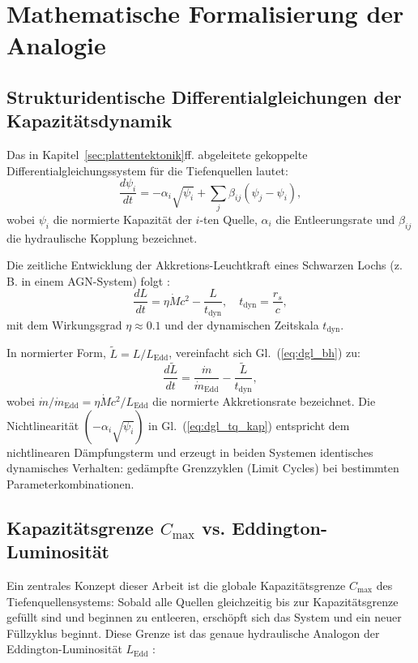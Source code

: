 ﻿\documentclass[12pt,a4paper]{report}
\begin{document}
\section{Mathematische Formalisierung der Analogie}

\subsection{Strukturidentische Differentialgleichungen der Kapazi\-tätsdynamik}

Das in Kapitel~\ref{sec:plattentektonik}ff. abgeleitete gekoppelte Differentialgleichungssystem für die Tiefenquellen lautet:
\begin{equation}
	\frac{d\psi_i}{dt} = -\alpha_i\sqrt{\psi_i} + \sum_j \beta_{ij}(\psi_j - \psi_i),
	\label{eq:dgl_tq_kap}
\end{equation}
wobei $\psi_i$ die normierte Kapazität der $i$-ten Quelle, $\alpha_i$ die Entleerungsrate und $\beta_{ij}$ die hydraulische Kopplung bezeichnet.

Die zeitliche Entwicklung der Akkretions-Leuchtkraft eines Schwarzen Lochs (z.\,B. in einem AGN-System) folgt \cite{shakura1973,kormendy2013}:
\begin{equation}
	\frac{dL}{dt} = \eta \dot{M} c^2 - \frac{L}{t_{\mathrm{dyn}}}, \quad t_{\mathrm{dyn}} = \frac{r_s}{c},
	\label{eq:dgl_bh}
\end{equation}
mit dem Wirkungsgrad $\eta \approx 0.1$ und der dynamischen Zeitskala $t_{\mathrm{dyn}}$.

In normierter Form, $\tilde{L} = L/L_{\mathrm{Edd}}$, vereinfacht sich Gl.~(\ref{eq:dgl_bh}) zu:
\begin{equation}
	\frac{d\tilde{L}}{dt} = \frac{\dot{m}}{\dot{m}_{\mathrm{Edd}}} - \frac{\tilde{L}}{t_{\mathrm{dyn}}},
	\label{eq:dgl_bh_norm}
\end{equation}
wobei $\dot{m}/\dot{m}_{\mathrm{Edd}} = \eta\dot{M}c^2/L_{\mathrm{Edd}}$ die normierte Akkretionsrate bezeichnet. Die Nichtlinearität $(-\alpha_i\sqrt{\psi_i})$ in Gl.~(\ref{eq:dgl_tq_kap}) entspricht dem nichtlinearen Dämpfungsterm und erzeugt in beiden Systemen identisches dynamisches Verhalten: gedämpfte Grenzzyklen (Limit Cycles) bei bestimmten Parameterkombinationen.

\subsection{Kapazitätsgrenze $C_{\max}$ vs. Eddington-Luminosität}

Ein zentrales Konzept dieser Arbeit ist die globale Kapazitätsgrenze $C_{\max}$ des Tiefenquellensystems: Sobald alle Quellen gleichzeitig bis zur Kapazitätsgrenze gefüllt sind und beginnen zu entleeren, erschöpft sich das System und ein neuer Füllzyklus beginnt. Diese Grenze ist das genaue hydraulische Analogon der Eddington-Luminosität $L_{\mathrm{Edd}}$ \cite{eddington1926}:
\end{document}
